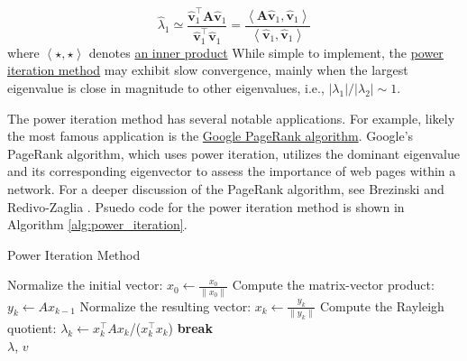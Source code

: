 \documentclass{article}[11pt]
\begin{document}
\begin{mdframed}
\begin{itemize}[leftmargin=16pt]
{   \begin{equation}
      \hat{\lambda}_{1} \simeq \frac{\hat{\mathbf{v}}_{1}^{\top}\mathbf{A}\hat{\mathbf{v}}_{1}}{\hat{\mathbf{v}}_{1}^{\top}\hat{\mathbf{v}}_{1}} = \frac{\left<\mathbf{A}\hat{\mathbf{v}}_{1},\hat{\mathbf{v}}_{1}\right>}{\left<\hat{\mathbf{v}}_{1},\hat{\mathbf{v}}_{1}\right>}
   \end{equation}
where $\left<\star,\star\right>$ denotes \href{https://mathworld.wolfram.com/InnerProduct.html}{an inner product}}
While simple to implement, the \href{https://en.wikipedia.org/wiki/Power_iteration}{power iteration method} may exhibit slow convergence, mainly when the largest eigenvalue is close in magnitude to other eigenvalues, i.e., $|\lambda_{1}|/|\lambda_{2}| \sim 1$.
\end{itemize}
\end{mdframed}
The power iteration method has several notable applications. For example, likely the most famous application is the \href{https://en.wikipedia.org/wiki/PageRank}{Google PageRank algorithm}.
Google's PageRank algorithm, which uses power iteration, utilizes the dominant eigenvalue and its corresponding eigenvector to assess the importance of web pages within a network.
For a deeper discussion of the PageRank algorithm, see Brezinski and Redivo-Zaglia \citep{Brezinski:2006}. Psuedo code for the power iteration method is shown in Algorithm \ref{alg:power_iteration}.
\begin{algorithm}[H]
   \caption{Power Iteration Method}\label{alg:power_iteration}
\begin{algorithmic}[1]
   
   \State Normalize the initial vector: $x_0 \leftarrow \frac{x_0}{\|x_0\|}$
       \State Compute the matrix-vector product: $y_k \leftarrow A x_{k-1}$
       \State Normalize the resulting vector: $x_k \leftarrow \frac{y_k}{\|y_k\|}$
       \State Compute the Rayleigh quotient: $\lambda_k \leftarrow x_k^\top A x_k$/($x_k^\top x_k$)
           \State \textbf{break}
       \EndIf
   \EndFor
   \\
   \Return $\lambda$, $v$
   \end{algorithmic}
\end{algorithm}
\end{document}

